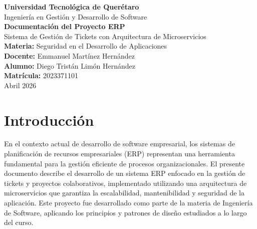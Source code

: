 \documentclass[12pt,a4paper]{article}
\begin{document}
\begin{titlepage}
    \centering
    \vspace*{1cm}


    {\Large\textbf{Universidad Tecnológica de Querétaro}}\\[0.3cm]
    {\large Ingeniería en Gestión y Desarrollo de Software}\\[2cm]

    {\LARGE\bfseries\color{primaryblue} Documentación del Proyecto ERP}\\[0.5cm]
    {\Large Sistema de Gestión de Tickets con Arquitectura de Microservicios}\\[2cm]

    {\large\textbf{Materia:} Seguridad en el Desarrollo de Aplicaciones}\\[0.5cm]
    {\large\textbf{Docente:} Emmanuel Martínez Hernández}\\[0.5cm]
    {\large\textbf{Alumno:} Diego Tristán Limón Hernández}\\[0.5cm]
    {\large\textbf{Matrícula:} 2023371101}\\[2cm]

    {\large Abril 2026}

    \vfill
\end{titlepage}

\newpage
\tableofcontents
\listoffigures
\listoftables
\newpage

\section{Introducción}

En el contexto actual de desarrollo de software empresarial, los sistemas de planificación de recursos empresariales (ERP) representan una herramienta fundamental para la gestión eficiente de procesos organizacionales. El presente documento describe el desarrollo de un sistema ERP enfocado en la gestión de tickets y proyectos colaborativos, implementado utilizando una arquitectura de microservicios que garantiza la escalabilidad, mantenibilidad y seguridad de la aplicación. Este proyecto fue desarrollado como parte de la materia de Ingeniería de Software, aplicando los principios y patrones de diseño estudiados a lo largo del curso.
\end{document}
